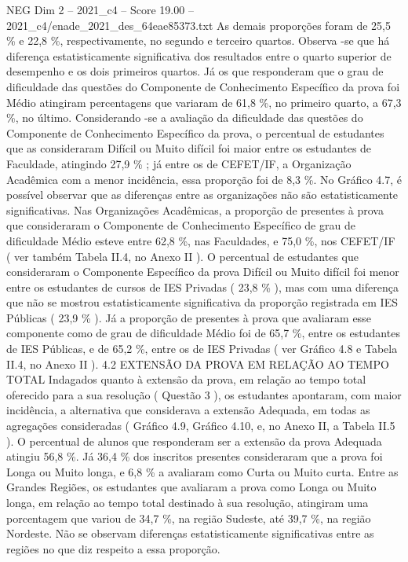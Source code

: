 \begin{textsample}{NEG Dim 2 – 2021\_c4 – Score 19.00 – 2021\_c4/enade\_2021\_des\_64eae85373.txt}
As demais proporções foram de 25,5 \% e 22,8 \%, respectivamente, no segundo e terceiro quartos.
Observa -se que há diferença estatisticamente significativa dos resultados entre o quarto superior de desempenho e os dois primeiros quartos.
Já os que responderam que o grau de dificuldade das questões do Componente de Conhecimento Específico da prova foi Médio atingiram percentagens que variaram de 61,8 \%, no primeiro quarto, a 67,3 \%, no último.
Considerando -se a avaliação da dificuldade das questões do Componente de Conhecimento Específico da prova, o percentual de estudantes que as consideraram Difícil ou Muito difícil foi maior entre os estudantes de Faculdade, atingindo 27,9 \% ; já entre os de CEFET/IF, a Organização Acadêmica com a menor incidência, essa proporção foi de 8,3 \%.
No Gráfico 4.7, é possível observar que as diferenças entre as organizações não são estatisticamente significativas.
Nas Organizações Acadêmicas, a proporção de presentes à prova que consideraram o Componente de Conhecimento Específico de grau de dificuldade Médio esteve entre 62,8 \%, nas Faculdades, e 75,0 \%, nos CEFET/IF ( ver também Tabela II.4, no Anexo II ).
O percentual de estudantes que consideraram o Componente Específico da prova Difícil ou Muito difícil foi menor entre os estudantes de cursos de IES Privadas ( 23,8 \% ), mas com uma diferença que não se mostrou estatisticamente significativa da proporção registrada em IES Públicas ( 23,9 \% ).
Já a proporção de presentes à prova que avaliaram esse componente como de grau de dificuldade Médio foi de 65,7 \%, entre os estudantes de IES Públicas, e de 65,2 \%, entre os de IES Privadas ( ver Gráfico 4.8 e Tabela II.4, no Anexo II ). 4.2 EXTENSÃO DA PROVA EM RELAÇÃO AO TEMPO TOTAL Indagados quanto à extensão da prova, em relação ao tempo total oferecido para a sua resolução ( Questão 3 ), os estudantes apontaram, com maior incidência, a alternativa que considerava a extensão Adequada, em todas as agregações consideradas ( Gráfico 4.9, Gráfico 4.10, e, no Anexo II, a Tabela II.5 ).
O percentual de alunos que responderam ser a extensão da prova Adequada atingiu 56,8 \%.
Já 36,4 \% dos inscritos presentes consideraram que a prova foi Longa ou Muito longa, e 6,8 \% a avaliaram como Curta ou Muito curta.
Entre as Grandes Regiões, os estudantes que avaliaram a prova como Longa ou Muito longa, em relação ao tempo total destinado à sua resolução, atingiram uma porcentagem que variou de 34,7 \%, na região Sudeste, até 39,7 \%, na região Nordeste.
Não se observam diferenças estatisticamente significativas entre as regiões no que diz respeito a essa proporção.

\end{textsample}
